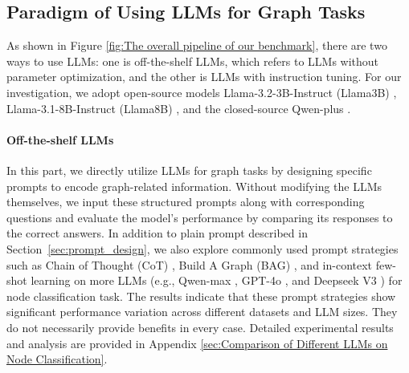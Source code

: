 \subsection{Paradigm of Using LLMs for Graph Tasks}
As shown in Figure \ref{fig:The overall pipeline of our benchmark}, there are two ways to use LLMs: one is off-the-shelf LLMs, which refers to LLMs without parameter optimization, and the other is LLMs with instruction tuning. For our investigation, we adopt  open-source models Llama-3.2-3B-Instruct (Llama3B) \cite{touvron2023llama}, Llama-3.1-8B-Instruct (Llama8B) \cite{touvron2023llama}, and the closed-source Qwen-plus \cite{bai2023qwen}.

\paragraph{\textbf{Off-the-shelf LLMs}}

In this part, we directly utilize LLMs for graph tasks by designing specific prompts to encode graph-related information. Without modifying the LLMs themselves, we input these structured prompts along with corresponding questions and evaluate the model’s performance by comparing its responses to the correct answers. In addition to plain prompt described in Section~\ref{sec:prompt_design}, we also explore commonly used prompt strategies such as Chain of Thought (CoT) \cite{CoT}, Build A Graph (BAG) \cite{nlgraph}, and in-context few-shot learning on more LLMs (e.g., Qwen-max \cite{bai2023qwen}, GPT-4o \cite{achiam2023gpt4}, and Deepseek V3 \cite{liu2024deepseek}) for node classification task. The results indicate that these prompt strategies show significant performance variation across different datasets and LLM sizes. They do not necessarily provide benefits in every case. Detailed experimental results and analysis are provided in Appendix \ref{sec:Comparison of Different LLMs on Node Classification}.


